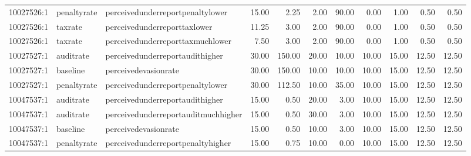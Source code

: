 \begin{table}[ht]
\begin{tabular}{lllrrrrrrrr}
  10027526:1 & penaltyrate & perceivedunderreportpenaltylower & 15.00 & 2.25 & 2.00 & 90.00 & 0.00 & 1.00 & 0.50 & 0.50 \\ 
  10027526:1 & taxrate & perceivedunderreporttaxlower & 11.25 & 3.00 & 2.00 & 90.00 & 0.00 & 1.00 & 0.50 & 0.50 \\ 
  10027526:1 & taxrate & perceivedunderreporttaxmuchlower & 7.50 & 3.00 & 2.00 & 90.00 & 0.00 & 1.00 & 0.50 & 0.50 \\ 
  10027527:1 & auditrate & perceivedunderreportaudithigher & 30.00 & 150.00 & 20.00 & 10.00 & 10.00 & 15.00 & 12.50 & 12.50 \\ 
  10027527:1 & baseline & perceivedevasionrate & 30.00 & 150.00 & 10.00 & 10.00 & 10.00 & 15.00 & 12.50 & 12.50 \\ 
  10027527:1 & penaltyrate & perceivedunderreportpenaltylower & 30.00 & 112.50 & 10.00 & 35.00 & 10.00 & 15.00 & 12.50 & 12.50 \\ 
  10047537:1 & auditrate & perceivedunderreportaudithigher & 15.00 & 0.50 & 20.00 & 3.00 & 10.00 & 15.00 & 12.50 & 12.50 \\ 
  10047537:1 & auditrate & perceivedunderreportauditmuchhigher & 15.00 & 0.50 & 30.00 & 3.00 & 10.00 & 15.00 & 12.50 & 12.50 \\ 
  10047537:1 & baseline & perceivedevasionrate & 15.00 & 0.50 & 10.00 & 3.00 & 10.00 & 15.00 & 12.50 & 12.50 \\ 
  10047537:1 & penaltyrate & perceivedunderreportpenaltyhigher & 15.00 & 0.75 & 10.00 & 0.00 & 10.00 & 15.00 & 12.50 & 12.50 \\ 
   \hline
\end{tabular}
\end{table}
